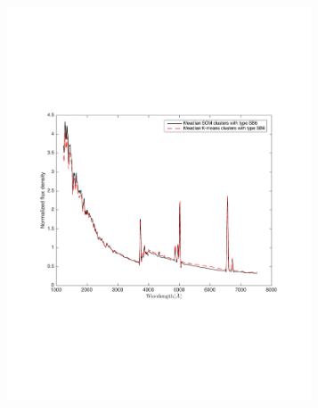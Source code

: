 \begin{figure}
                \begin{subfigure}[b]{0.5\textwidth}
                    \centering
                  \includegraphics[width=0.99\textwidth]{k_means_images/SB6_comp.pdf}
                \end{subfigure}
                \hfill
                \begin{subfigure}[b]{0.5\textwidth}

\end{subfigure}
\end{figure}
